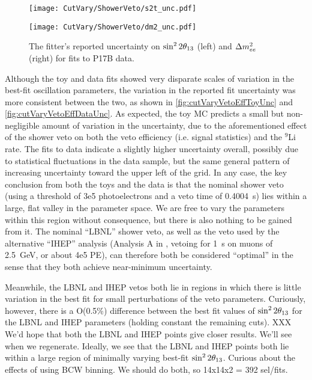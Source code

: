 \documentclass[../thesis.tex]{subfiles}
\begin{document}
\begin{figure}[ht]
  \begin{minipage}{0.5\linewidth}%
    \texttt{[image: CutVary/ShowerVeto/s2t\_unc.pdf]}%
  \end{minipage}%
  \begin{minipage}{0.5\linewidth}%
    \texttt{[image: CutVary/ShowerVeto/dm2\_unc.pdf]}%
  \end{minipage}%
  \caption{The fitter's reported uncertainty on $\sin^2 2\theta_{13}$ (left) and $\Delta m^2_{ee}$ (right) for fits to P17B data.}
  \label{fig:cutVaryVetoEffDataUnc}
\end{figure}

Although the toy and data fits showed very disparate scales of variation in the best-fit oscillation parameters, the variation in the reported fit uncertainty was more consistent between the two, as shown in \autoref{fig:cutVaryVetoEffToyUnc} and \autoref{fig:cutVaryVetoEffDataUnc}. As expected, the toy MC predicts a small but non-negligible amount of variation in the uncertainty, due to the aforementioned effect of the shower veto on both the veto efficiency (i.e. signal statistics) and the $^9$Li rate. The fits to data indicate a slightly higher uncertainty overall, possibly due to statistical fluctuations in the data sample, but the same general pattern of increasing uncertainty toward the upper left of the grid. In any case, the key conclusion from both the toys and the data is that the nominal shower veto (using a threshold of 3e5 photoelectrons and a veto time of 0.4004~s) lies within a large, flat valley in the parameter space. We are free to vary the parameters within this region without consequence, but there is also nothing to be gained from it. The nominal ``LBNL'' shower veto, as well as the veto used by the alternative ``IHEP'' analysis (Analysis A in \cite{An_2017}, vetoing for 1~s on muons of 2.5~GeV, or about 4e5 PE), can therefore both be considered ``optimal'' in the sense that they both achieve near-minimum uncertainty.

Meanwhile, the LBNL and IHEP vetos both lie in regions in which there is little variation in the best fit for small perturbations of the veto parameters. Curiously, however, there is a O(0.5\%) difference between the best fit values of $\sin^2 2\theta_{13}$ for the LBNL and IHEP parameters (holding constant the remaining cuts). XXX We'd hope that both the LBNL and IHEP points give closer results. We'll see when we regenerate. Ideally, we see that the LBNL and IHEP points both lie within a large region of minimally varying best-fit $\sin^2 2\theta_{13}$. Curious about the effects of using BCW binning. We should do both, so 14x14x2 = 392 sel/fits.
\end{document}
